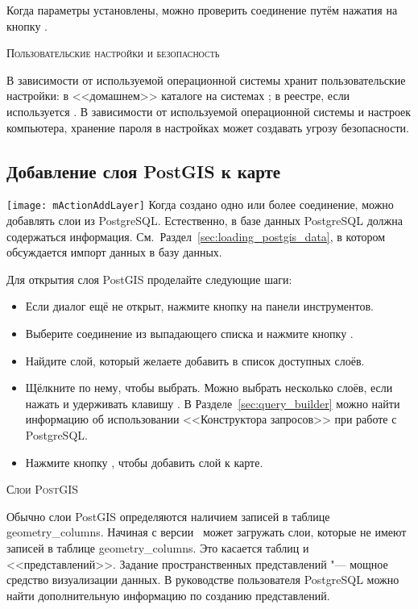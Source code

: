 Когда параметры установлены, можно проверить соединение путём нажатия
на кнопку  .

\begin{Tip}\caption{\textsc{\qg Пользовательские настройки и безопасность}}
В зависимости от используемой операционной системы \qg хранит
пользовательские настройки: в <<домашнем>> каталоге на \nix системах
; в реестре, если используется \win. В зависимости
от используемой операционной системы и настроек компьютера, хранение пароля
в настройках \qg может создавать угрозу безопасности.
\end{Tip}

\subsection{Добавление слоя PostGIS к карте}

\texttt{[image: mActionAddLayer]} Когда создано одно или
более соединение, можно добавлять слои из PostgreSQL. Естественно, в базе
данных PostgreSQL должна содержаться
информация. См.~Раздел~\ref{sec:loading_postgis_data}, в котором
обсуждается импорт данных в базу данных.

Для открытия слоя PostGIS проделайте следующие шаги:

\begin{itemize}[label=--]
\item Если диалог  ещё не открыт, нажмите
кнопку  на панели
инструментов.
\item Выберите соединение из выпадающего списка и нажмите кнопку
.
\item Найдите слой, который желаете добавить в список доступных слоёв.
\item Щёлкните по нему, чтобы выбрать. Можно выбрать несколько слоёв,
если нажать и удерживать клавишу . В
Разделе~\ref{sec:query_builder} можно найти информацию об использовании
<<Конструктора запросов>> при работе с PostgreSQL.
\item Нажмите кнопку , чтобы добавить слой к карте.
\end{itemize}

\begin{Tip}\caption{\textsc{Слои PostGIS}}
Обычно слои PostGIS определяются наличием записей в таблице
geometry\_columns. Начиная с версии \OLD\, %
\qg может загружать слои, которые не имеют записей в таблице
geometry\_columns. Это касается таблиц и <<представлений>>.
Задание пространственных представлений "--- мощное средство визуализации данных.
В руководстве пользователя PostgreSQL можно найти дополнительную информацию
по созданию представлений.
\end{Tip}

